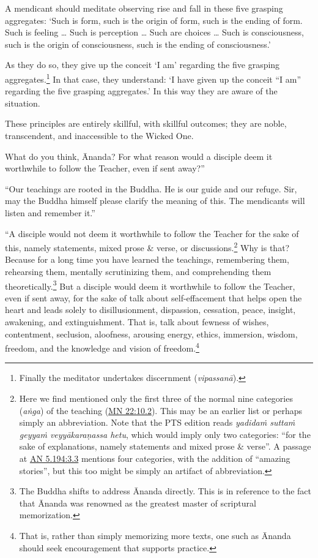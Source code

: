 \documentclass[12pt,openany]{book}%
\begin{document}
A mendicant should meditate observing rise and fall in these five grasping aggregates: ‘Such is form, such is the origin of form, such is the ending of form. Such is feeling … Such is perception … Such are choices … Such is consciousness, such is the origin of consciousness, such is the ending of consciousness.’ 

As they do so, they give up the conceit ‘I am’ regarding the five grasping aggregates.\footnote{Finally the meditator undertakes discernment (\textit{\textsanskrit{vipassanā}}). } In that case, they understand: ‘I have given up the conceit “I am” regarding the five grasping aggregates.’ In this way they are aware of the situation. 

These principles are entirely skillful, with skillful outcomes; they are noble, transcendent, and inaccessible to the Wicked One. 

What do you think, Ānanda? For what reason would a disciple deem it worthwhile to follow the Teacher, even if sent away?” 

“Our teachings are rooted in the Buddha. He is our guide and our refuge. Sir, may the Buddha himself please clarify the meaning of this. The mendicants will listen and remember it.” 

“A disciple would not deem it worthwhile to follow the Teacher for the sake of this, namely statements, mixed prose \& verse, or discussions.\footnote{Here we find mentioned only the first three of the normal nine categories (\textit{\textsanskrit{aṅga}}) of the teaching (\href{https://suttacentral.net/mn22/en/sujato\#10.2}{MN 22:10.2}). This may be an earlier list or perhaps simply an abbreviation. Note that the PTS edition reads \textit{\textsanskrit{yadidaṁ} \textsanskrit{suttaṁ} \textsanskrit{geyyaṁ} \textsanskrit{veyyākaraṇassa} hetu}, which would imply only two categories: “for the sake of explanations, namely statements and mixed prose \& verse”. A passage at \href{https://suttacentral.net/an5.194/en/sujato\#3.3}{AN 5.194:3.3} mentions four categories, with the addition of “amazing stories”, but this too might be simply an artifact of abbreviation. } Why is that? Because for a long time you have learned the teachings, remembering them, rehearsing them, mentally scrutinizing them, and comprehending them theoretically.\footnote{The Buddha shifts to address Ānanda directly. This is in reference to the fact that Ānanda was renowned as the greatest master of scriptural memorization. } But a disciple would deem it worthwhile to follow the Teacher, even if sent away, for the sake of talk about self-effacement that helps open the heart and leads solely to disillusionment, dispassion, cessation, peace, insight, awakening, and extinguishment. That is, talk about fewness of wishes, contentment, seclusion, aloofness, arousing energy, ethics, immersion, wisdom, freedom, and the knowledge and vision of freedom.\footnote{That is, rather than simply memorizing more texts, one such as Ānanda should seek encouragement that supports practice. } 
\end{document}
